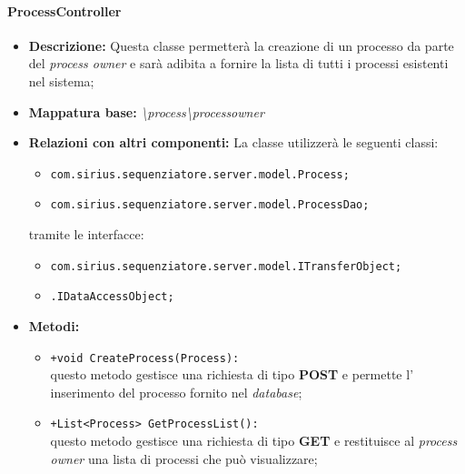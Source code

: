 \paragraph{ProcessController}%
\begin{itemize}
	\item \textbf{Descrizione: } Questa classe permetterà la creazione di un processo da parte del \textit{process owner} e sarà adibita a fornire la lista di tutti i processi esistenti nel sistema;
	\item \textbf{Mappatura base: } \textit{\textbackslash process\textbackslash processowner}
	\item \textbf{Relazioni con altri componenti: }
	La classe utilizzerà le seguenti classi:
	\begin{itemize}
		\item \texttt{com.sirius.sequenziatore.server.model.Process;}
		\item \texttt{com.sirius.sequenziatore.server.model.ProcessDao;}
	\end{itemize}
	tramite le interfacce:
	\begin{itemize}
		\item \texttt{com.sirius.sequenziatore.server.model.ITransferObject;}
		\item \texttt{\sModel .IDataAccessObject;}
	\end{itemize}
	\item \textbf{Metodi: }
				\begin{itemize}
					\item \texttt{+void CreateProcess(Process):}\\
					questo metodo gestisce una richiesta di tipo \textbf{POST} e permette l' inserimento del processo fornito nel \textit{database};
					\item \texttt{+List<Process> GetProcessList():}\\
					 questo metodo gestisce una richiesta di tipo \textbf{GET} e restituisce al \textit{process owner} una lista di processi che può visualizzare;
				\end{itemize}
\end{itemize}
